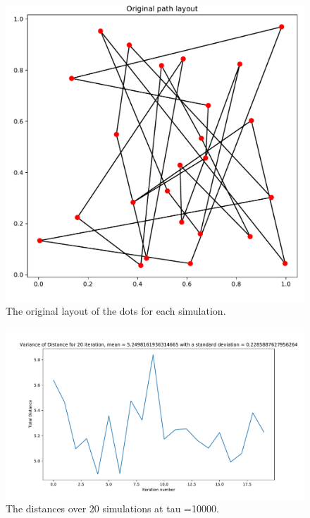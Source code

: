 \documentclass{article}
\begin{document}
 \begin{figure}[H]
     \centerline{\includegraphics[scale=0.6]{images/Q1a_path0_tau10000.pdf}}
     \caption{The original layout of the dots for each simulation.}
     \label{fig:1a_original}
 \end{figure}
 \begin{figure}[H]
     \centerline{\includegraphics[scale=0.6]{images/Q1a_distances_tau10000.pdf}}
     \caption{The distances over 20 simulations at tau =10000.}
     \label{fig:1a_distances_tau10000}
 \end{figure}
\end{document}
